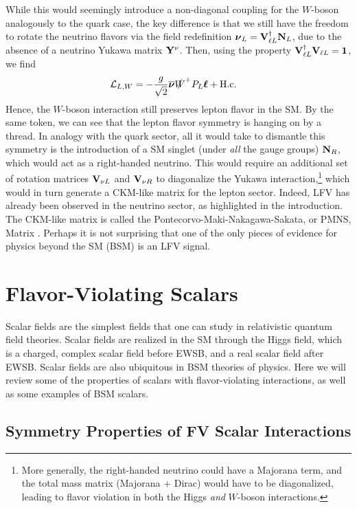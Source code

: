 While this would seemingly introduce a non-diagonal coupling for the $W$-boson analogously to the quark case, the key difference is that we still have the freedom to rotate the neutrino flavors via the field redefinition ${\boldsymbol{\nu}}_L = {\bf V}_{\ell L}^\dagger {\bf N}_L$, due to the absence of a neutrino Yukawa matrix ${\bf Y}^\nu$.  Then, using the property ${\bf V}_{\ell L}^\dagger {\bf V}_{\ell L} = {\bf 1}$, we find 
\begin{align}
    {\cal L}_{L,W} &= -\frac{g}{\sqrt{2}}\overline{\boldsymbol \nu}{\slashed W}^+P_L{\boldsymbol \ell} + {\rm H.c.}
\end{align}
Hence, the $W$-boson interaction still preserves lepton flavor in the SM. By the same token, we can see that the lepton flavor symmetry is hanging on by a thread. In analogy with the quark sector, all it would take to dismantle this symmetry is the introduction of a SM singlet (under {\it all} the gauge groups) ${\bf N}_R$, which would act as a right-handed neutrino. This would require an additional set of rotation matrices ${\bf V}_{\nu L}$ and ${\bf V}_{\nu R}$ to diagonalize the Yukawa interaction,\footnote{More generally, the right-handed neutrino could have a Majorana term, and the total mass matrix (Majorana + Dirac) would have to be diagonalized, leading to flavor violation in both the Higgs {\it and} $W$-boson interactions.} which would in turn generate a CKM-like matrix for the lepton sector. Indeed, LFV has already been observed in the neutrino sector, as highlighted in the introduction. The CKM-like matrix is called the Pontecorvo-Maki-Nakagawa-Sakata, or PMNS, Matrix \cite{Pontecorvo:1967fh,Maki:1962mu}. Perhaps it is not surprising that one of the only pieces of evidence for physics beyond the SM (BSM) is an LFV signal.

\section{Flavor-Violating Scalars}\label{sec:FV_scalars}

Scalar fields are the simplest fields that one can study in relativistic quantum field theories. Scalar fields are realized in the SM through the Higgs field, which is a charged, complex scalar field before EWSB, and a real scalar field after EWSB. Scalar fields are also ubiquitous in BSM theories of physics. Here we will review some of the properties of scalars with flavor-violating interactions, as well as some examples of BSM scalars. 


\subsection{Symmetry Properties of FV Scalar Interactions}\label{sec:FV_scalar_CPT}


